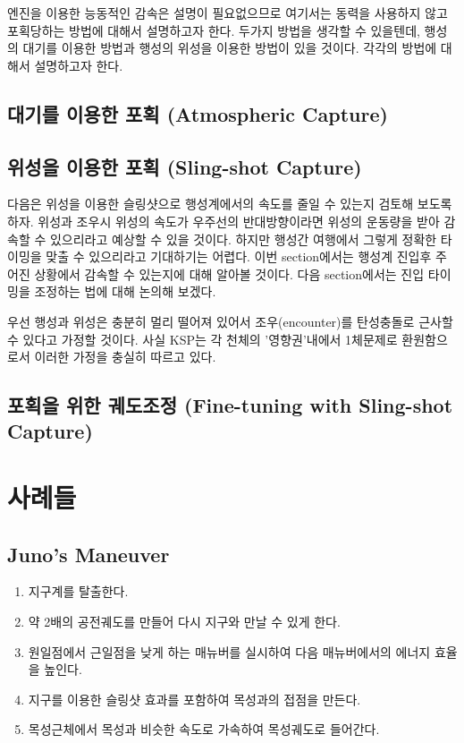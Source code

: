 \documentclass[10pt]{amsbook}
\begin{document}
엔진을 이용한 능동적인 감속은 설명이 필요없으므로 여기서는 동력을 사용하지 않고 포획당하는 방법에 대해서 설명하고자 한다. 두가지 방법을 생각할 수 있을텐데, 행성의 대기를 이용한 방법과 행성의 위성을 이용한 방법이 있을 것이다. 각각의 방법에 대해서 설명하고자 한다.
\section{대기를 이용한 포획 (Atmospheric Capture)}
\section{위성을 이용한 포획 (Sling-shot Capture)}
다음은 위성을 이용한 슬링샷으로 행성계에서의 속도를 줄일 수 있는지 검토해 보도록 하자. 위성과 조우시 위성의 속도가 우주선의 반대방향이라면 위성의 운동량을 받아 감속할 수 있으리라고 예상할 수 있을 것이다. 하지만 행성간 여행에서 그렇게 정확한 타이밍을 맞출 수 있으리라고 기대하기는 어렵다. 이번 section에서는 행성계 진입후 주어진 상황에서 감속할 수 있는지에 대해 알아볼 것이다. 다음 section에서는 진입 타이밍을 조정하는 법에 대해 논의해 보겠다.

우선 행성과 위성은 충분히 멀리 떨어져 있어서 조우(encounter)를 탄성충돌로 근사할 수 있다고 가정할 것이다. 사실 KSP는 각 천체의 '영향권'내에서 1체문제로 환원함으로서 이러한 가정을 충실히 따르고 있다.
\section{포획을 위한 궤도조정 (Fine-tuning with Sling-shot Capture)}

\chapter{사례들}
\section{Juno's Maneuver}
\begin{enumerate}
\item 지구계를 탈출한다.
\item 약 2배의 공전궤도를 만들어 다시 지구와 만날 수 있게 한다.
\item 원일점에서 근일점을 낮게 하는 매뉴버를 실시하여 다음 매뉴버에서의 에너지 효율을 높인다.
\item 지구를 이용한 슬링샷 효과를 포함하여 목성과의 접점을 만든다.
\item 목성근체에서 목성과 비슷한 속도로 가속하여 목성궤도로 들어간다.
\end{enumerate}
\end{document}
